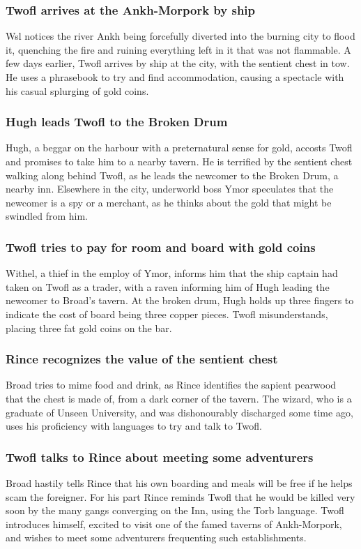 \subsubsection{\Gls{Twofl} arrives at the Ankh-Morpork by ship}
\Gls{Wsl} notices the river Ankh being forcefully diverted into the burning city to flood it,
quenching the fire and ruining everything left in it that was not flammable. A few days earlier,
\Gls{Twofl} arrives by ship at the city, with the sentient chest in tow. He uses a phrasebook to
try and find accommodation, causing a spectacle with his casual splurging of gold coins.

\subsubsection{\Gls{Hugh} leads \Gls{Twofl} to the Broken Drum}
\Gls{Hugh}, a beggar on the harbour with a preternatural sense for gold, accosts \Gls{Twofl} and
promises to take him to a nearby tavern. He is terrified by the sentient chest walking along behind
\Gls{Twofl}, as he leads the newcomer to the Broken Drum, a nearby inn. Elsewhere in the city,
underworld boss \Gls{Ymor} speculates that the newcomer is a spy or a merchant, as he thinks about
the gold that might be swindled from him.

\subsubsection{\Gls{Twofl} tries to pay for room and board with gold coins}
\Gls{Withel}, a thief in the employ of \Gls{Ymor}, informs him that the ship captain had taken on
\Gls{Twofl} as a trader, with a raven informing him of \Gls{Hugh} leading the newcomer to
\Gls{Broad}'s tavern. At the broken drum, \Gls{Hugh} holds up three fingers to indicate the cost
of board being three copper pieces. \Gls{Twofl} misunderstands, placing three fat gold coins on the
bar.

\subsubsection{\Gls{Rince} recognizes the value of the sentient chest}
\Gls{Broad} tries to mime food and drink, as \Gls{Rince} identifies the sapient pearwood that the
chest is made of, from a dark corner of the tavern. The wizard, who is a graduate of Unseen
University, and was dishonourably discharged some time ago, uses his proficiency with languages to
try and talk to \Gls{Twofl}.

\subsubsection{\Gls{Twofl} talks to \Gls{Rince} about meeting some adventurers}
\Gls{Broad} hastily tells \Gls{Rince} that his own boarding and meals will be free if he helps
scam the foreigner. For his part \Gls{Rince} reminds \Gls{Twofl} that he would be killed very soon
by the many gangs converging on the Inn, using the Torb language. \Gls{Twofl} introduces himself,
excited to visit one of the famed taverns of Ankh-Morpork, and wishes to meet some adventurers
frequenting such establishments.

